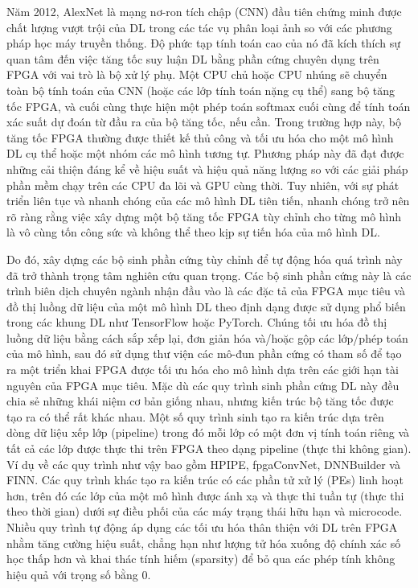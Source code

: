 \documentclass[a4paper]{article}
\begin{document}
    Năm 2012, AlexNet là mạng nơ-ron tích chập (CNN) đầu tiên chứng minh được chất lượng vượt trội của DL trong các tác vụ phân loại ảnh so với các phương pháp học máy truyền thống. Độ phức tạp tính toán cao của nó đã kích thích sự quan tâm đến việc tăng tốc suy luận DL bằng phần cứng chuyên dụng trên FPGA với vai trò là bộ xử lý phụ. Một CPU chủ hoặc CPU nhúng sẽ chuyển toàn bộ tính toán của CNN (hoặc các lớp tính toán nặng cụ thể) sang bộ tăng tốc FPGA, và cuối cùng thực hiện một phép toán softmax cuối cùng để tính toán xác suất dự đoán từ đầu ra của bộ tăng tốc, nếu cần. Trong trường hợp này, bộ tăng tốc FPGA thường được thiết kế thủ công và tối ưu hóa cho một mô hình DL cụ thể hoặc một nhóm các mô hình tương tự. Phương pháp này đã đạt được những cải thiện đáng kể về hiệu suất và hiệu quả năng lượng so với các giải pháp phần mềm chạy trên các CPU đa lõi và GPU cùng thời. Tuy nhiên, với sự phát triển liên tục và nhanh chóng của các mô hình DL tiên tiến, nhanh chóng trở nên rõ ràng rằng việc xây dựng một bộ tăng tốc FPGA tùy chỉnh cho từng mô hình là vô cùng tốn công sức và không thể theo kịp sự tiến hóa của mô hình DL.
    
    Do đó, xây dựng các bộ sinh phần cứng tùy chỉnh để tự động hóa quá trình này đã trở thành trọng tâm nghiên cứu quan trọng. Các bộ sinh phần cứng này là các trình biên dịch chuyên ngành nhận đầu vào là các đặc tả của FPGA mục tiêu và đồ thị luồng dữ liệu của một mô hình DL theo định dạng được sử dụng phổ biến trong các khung DL như TensorFlow hoặc PyTorch. Chúng tối ưu hóa đồ thị luồng dữ liệu bằng cách sắp xếp lại, đơn giản hóa và/hoặc gộp các lớp/phép toán của mô hình, sau đó sử dụng thư viện các mô-đun phần cứng có tham số để tạo ra một triển khai FPGA được tối ưu hóa cho mô hình dựa trên các giới hạn tài nguyên của FPGA mục tiêu. Mặc dù các quy trình sinh phần cứng DL này đều chia sẻ những khái niệm cơ bản giống nhau, nhưng kiến trúc bộ tăng tốc được tạo ra có thể rất khác nhau. Một số quy trình sinh tạo ra kiến trúc dựa trên dòng dữ liệu xếp lớp (pipeline) trong đó mỗi lớp có một đơn vị tính toán riêng và tất cả các lớp được thực thi trên FPGA theo dạng pipeline (thực thi không gian). Ví dụ về các quy trình như vậy bao gồm HPIPE, fpgaConvNet, DNNBuilder và FINN. Các quy trình khác tạo ra kiến trúc có các phần tử xử lý (PEs) linh hoạt hơn, trên đó các lớp của một mô hình được ánh xạ và thực thi tuần tự (thực thi theo thời gian) dưới sự điều phối của các máy trạng thái hữu hạn và microcode. Nhiều quy trình tự động áp dụng các tối ưu hóa thân thiện với DL trên FPGA nhằm tăng cường hiệu suất, chẳng hạn như lượng tử hóa xuống độ chính xác số học thấp hơn và khai thác tính hiếm (sparsity) để bỏ qua các phép tính không hiệu quả với trọng số bằng 0.
    
\end{document}
